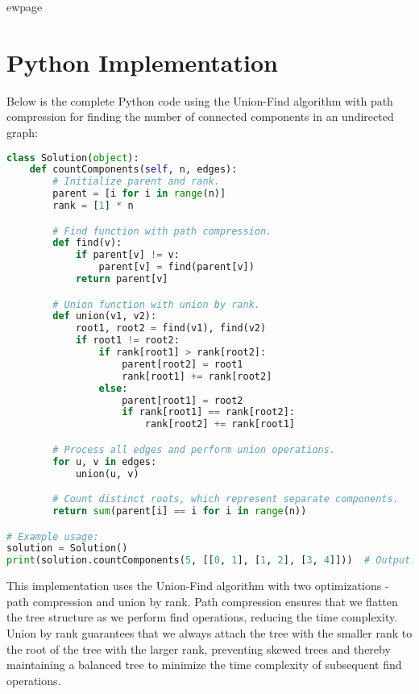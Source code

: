 ewpage %
\section*{Python Implementation}
Below is the complete Python code using the Union-Find algorithm with path compression for finding the number of connected components in an undirected graph:

\begin{fullwidth}
\begin{lstlisting}[language=Python]
class Solution(object):
    def countComponents(self, n, edges):
        # Initialize parent and rank.
        parent = [i for i in range(n)]
        rank = [1] * n

        # Find function with path compression.
        def find(v):
            if parent[v] != v:
                parent[v] = find(parent[v])
            return parent[v]

        # Union function with union by rank.
        def union(v1, v2):
            root1, root2 = find(v1), find(v2)
            if root1 != root2:
                if rank[root1] > rank[root2]:
                    parent[root2] = root1
                    rank[root1] += rank[root2]
                else:
                    parent[root1] = root2
                    if rank[root1] == rank[root2]:
                        rank[root2] += rank[root1]

        # Process all edges and perform union operations.
        for u, v in edges:
            union(u, v)

        # Count distinct roots, which represent separate components.
        return sum(parent[i] == i for i in range(n))

# Example usage:
solution = Solution()
print(solution.countComponents(5, [[0, 1], [1, 2], [3, 4]]))  # Output: 2
\end{lstlisting}

\end{fullwidth}

This implementation uses the Union-Find algorithm with two optimizations - path compression and union by rank. Path compression ensures that we flatten the tree structure as we perform find operations, reducing the time complexity. Union by rank guarantees that we always attach the tree with the smaller rank to the root of the tree with the larger rank, preventing skewed trees and thereby maintaining a balanced tree to minimize the time complexity of subsequent find operations.

